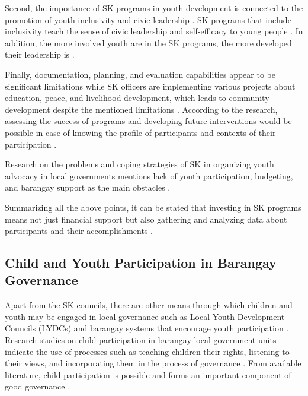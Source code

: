 \hspace*{\parindent}Second, the importance of SK programs in youth development is connected to the promotion of youth inclusivity and civic leadership \cite{G}. SK programs that include inclusivity teach the sense of civic leadership and self-efficacy to young people \cite{G}. In addition, the more involved youth are in the SK programs, the more developed their leadership is \cite{I}.
\vspace{5mm}

\hspace*{\parindent}Finally, documentation, planning, and evaluation capabilities appear to be significant limitations while SK officers are implementing various projects about education, peace, and livelihood development, which leads to community development despite the mentioned limitations \cite{AC}. According to the research, assessing the success of programs and developing future interventions would be possible in case of knowing the profile of participants and contexts of their participation \cite{I,AP}.
\vspace{5mm}

\hspace*{\parindent}Research on the problems and coping strategies of SK in organizing youth advocacy in local governments mentions lack of youth participation, budgeting, and barangay support as the main obstacles \cite{AB}.
\vspace{5mm}

\hspace*{\parindent}Summarizing all the above points, it can be stated that investing in SK programs means not just financial support but also gathering and analyzing data about participants and their accomplishments \cite{G,I,AC,AP}.
\vspace{5mm}

\subsection{Child and Youth Participation in Barangay Governance}

\hspace*{\parindent}Apart from the SK councils, there are other means through which children and youth may be engaged in local governance such as Local Youth Development Councils (LYDCs) and barangay systems that encourage youth participation \cite{AK}. Research studies on child participation in barangay local government units indicate the use of processes such as teaching children their rights, listening to their views, and incorporating them in the process of governance \cite{AK}. From available literature, child participation is possible and forms an important component of good governance \cite{AK}.
\vspace{5mm}

